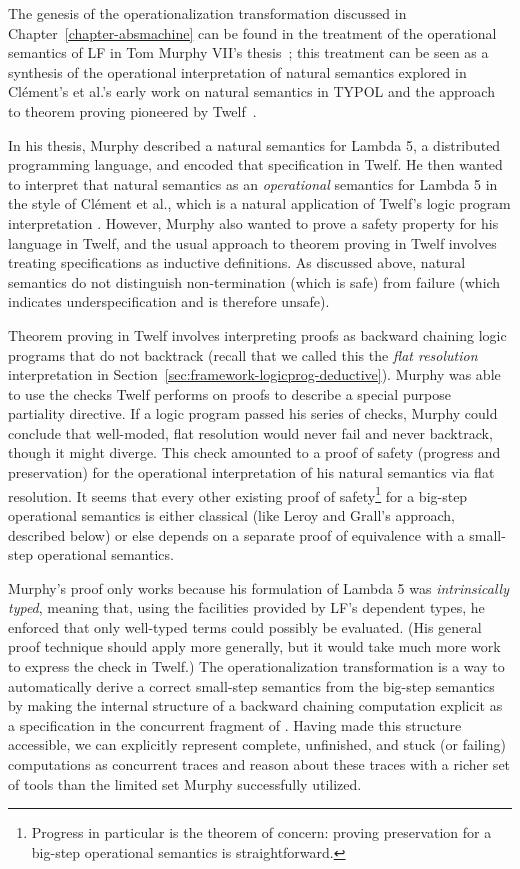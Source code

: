 The genesis of the operationalization transformation discussed in
Chapter~\ref{chapter-absmachine} 
can be found in the treatment of the operational semantics
of LF in Tom Murphy VII's thesis~\cite{murphy08modal}; this treatment
can be seen as a synthesis of the operational interpretation of
natural semantics explored in Cl\'ement's et al.'s early work on
natural semantics in TYPOL and the approach to theorem proving
pioneered by Twelf~\cite{pfenning99system}.

In his thesis, Murphy described a natural semantics for Lambda 5, a
distributed programming language, and encoded that specification in
Twelf. He then wanted to interpret that natural semantics as an {\it
  operational} semantics for Lambda 5 in the style of Cl\'ement et
al., which is a natural application of Twelf's logic program
interpretation \cite{michaylov91natural}.  However, Murphy also wanted
to prove a safety property for his language in Twelf, and the usual
approach to theorem proving in Twelf involves treating specifications
as inductive definitions. As discussed above, natural semantics do not
distinguish non-termination (which is safe) from failure (which
indicates underspecification and is therefore unsafe).

Theorem proving in Twelf involves interpreting proofs as backward
chaining logic programs that do not backtrack (recall that we called
this the {\it flat resolution} interpretation in
Section~\ref{sec:framework-logicprog-deductive}).  Murphy was able to
use the checks Twelf performs on proofs to describe a special purpose
partiality directive. If a logic program passed his series of checks,
Murphy could conclude that well-moded, flat resolution would
never fail and never backtrack, though it might diverge. This check
amounted to a proof of safety (progress and preservation) for the
operational interpretation of his natural semantics via flat
resolution. It seems that every other existing proof of
safety\footnote{Progress in particular is the theorem of concern:
  proving preservation for a big-step operational semantics is
  straightforward.} for a big-step operational semantics is either
classical (like Leroy and Grall's approach, described below) or else
depends on a separate proof of equivalence with a small-step
operational semantics.

Murphy's proof only works because his formulation of Lambda 5 was {\it
  intrinsically typed}, meaning that, using the facilities provided by
LF's dependent types, he enforced that only well-typed terms could
possibly be evaluated. (His general proof technique should apply more
generally, but it would take much more work to express the check in
Twelf.)  The operationalization transformation is a way to
automatically derive a correct small-step semantics from the big-step
semantics by making the internal structure of a backward chaining
computation explicit as a specification in the concurrent fragment of
\sls. Having made this structure accessible, we can explicitly
represent complete, unfinished, and stuck (or failing) computations as
concurrent traces and reason about these traces with a richer set of
tools than the limited set Murphy successfully utilized.

